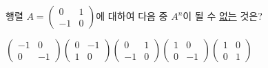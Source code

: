 행렬 $A=\begin{pmatrix} 0 & 1 \\ -1 & 0 \end{pmatrix}$에 대하여 다음 중 $A^n$이 될 수 \underline{없는} 것은? 
\begin{choicesii}{$\begin{pmatrix} -1 & 0 \\ 0 & -1 \end{pmatrix}$}{$\begin{pmatrix} 0 & -1 \\ 1 & 0 \end{pmatrix}$}{$\begin{pmatrix} 0 & 1 \\ -1 & 0 \end{pmatrix}$}{$\begin{pmatrix} 1 & 0 \\ 0 & -1 \end{pmatrix}$}{$\begin{pmatrix} 1 & 0 \\ 0 & 1 \end{pmatrix}$}\end{choicesii}
